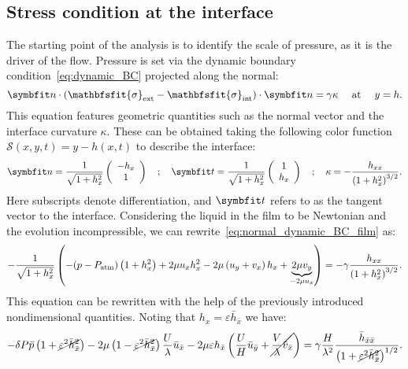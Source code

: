 \subsection{Stress condition at the interface}
 The starting point of the analysis is to identify the scale of pressure, as it is the driver of the flow. Pressure is set via the dynamic boundary condition~\eqref{eq:dynamic_BC} projected along the normal:
\begin{equation}
\bn\cdot\lp\mathbfsfit{\sigma}_\text{ext} - \mathbfsfit{\sigma}_\text{int}\rp \cdot\bn = \gamma \kappa \quad\text{ at }\quad y = h.
\label{eq:normal_dynamic_BC_film}
\end{equation}
This equation features geometric quantities such as the normal vector and the interface curvature $\kappa$. These can be obtained taking the following color function $\mathcal S(x,y,t) = y - h(x,t)$ to describe the interface:
\begin{equation}
\bn = \frac{1}{\sqrt{1+h_x^2}}
\lp
\begin{array}{c}
-h_x\\
1
\end{array}
\rp
\quad
;
\quad
\bt = \frac{1}{\sqrt{1+h_x^2}}
\lp
\begin{array}{c}
1\\
h_x
\end{array}
\rp
\quad
;
\quad
\kappa = - \frac{h_{xx}}{\lp 1+h_x^2 \rp^{3/2}}.
\end{equation}
Here subscripts denote differentiation, and $\bt$ refers to as the tangent vector to the interface. Considering the liquid in the film to be Newtonian and the evolution incompressible, we can rewrite~\eqref{eq:normal_dynamic_BC_film} as:
\begin{equation}
-\frac{1}{\sqrt{1+h_x^2}}\left( -(p-P_\text{atm})\left(1+h_x^2\right)+2\mu u_x h_x^2 -2\mu\left( u_y+v_x\right) h_x + \underbrace{2\mu v_y}_{-2\mu u_x}\right)=-\gamma\frac{h_{xx}}{\left(1+h_x^2\right)^{3/2}}.
\end{equation}
This equation can be rewritten with the help of the previously introduced nondimensional quantities. Noting that $h_x = \varepsilon \bar h_{\bar x}$ we have:
\begin{equation}
-\delta P \bar p \left( 1+ \cancel{\varepsilon^2 \bar h_{\bar x}^2} \right) - 2\mu\left( 1 - \cancel{\varepsilon^2 \bar h_{\bar x}^2}\right) \frac{U}{\lambda} \bar u_{\bar x} - 2 \mu \varepsilon h_{\bar x} \left( \frac{U}{H} \bar u_{\bar y} + \cancel{\frac{V}{\lambda} \bar v_{\bar x}} \right) = \gamma \frac{H}{\lambda^2} \frac{\bar h_{\bar x \bar x}}{\left( 1 + \cancel{\varepsilon^2 \bar h_{\bar x}^2} \right)^{1/2}}.
\end{equation}
